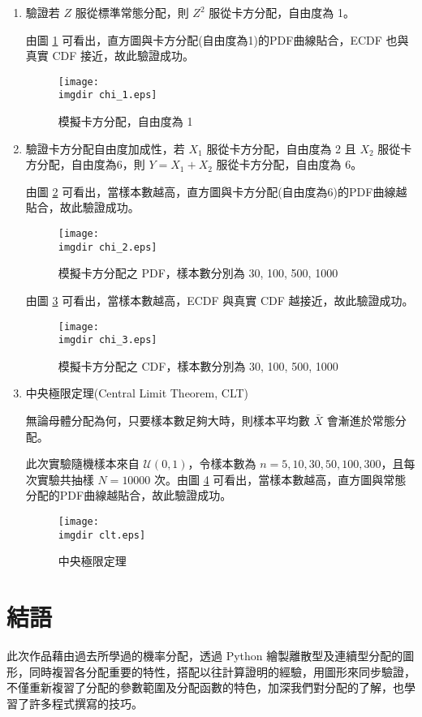 \begin{enumerate}
\item
驗證若 $Z$ 服從標準常態分配，則 $Z^2$ 服從卡方分配，自由度為 1。
 
由圖 \ref{fig:chi_1} 可看出，直方圖與卡方分配(自由度為1)的PDF曲線貼合，ECDF 也與真實 CDF 接近，故此驗證成功。
\begin{figure}[H]
    \centering
        \texttt{[image: \\imgdir chi\_1.eps]}
    \caption{模擬卡方分配，自由度為 1}
    \label{fig:chi_1}
\end{figure}

\item
驗證卡方分配自由度加成性，若 $X_1$ 服從卡方分配，自由度為 2 且 $X_2$ 服從卡方分配，自由度為6，則 $Y = X_1 + X_2$ 服從卡方分配，自由度為 6。

由圖 \ref{fig:chi_2} 可看出，當樣本數越高，直方圖與卡方分配(自由度為6)的PDF曲線越貼合，故此驗證成功。

\begin{figure}[H]
    \centering
        \texttt{[image: \\imgdir chi\_2.eps]}
    \caption{模擬卡方分配之 PDF，樣本數分別為 30, 100, 500, 1000}
    \label{fig:chi_2}    
\end{figure}
由圖 \ref{fig:chi_3} 可看出，當樣本數越高，ECDF 與真實 CDF 越接近，故此驗證成功。

\begin{figure}[H]
    \centering
        \texttt{[image: \\imgdir chi\_3.eps]}
    \caption{模擬卡方分配之 CDF，樣本數分別為 30, 100, 500, 1000}
    \label{fig:chi_3}    
\end{figure}

\item
中央極限定理(Central Limit Theorem, CLT)

無論母體分配為何，只要樣本數足夠大時，則樣本平均數 $\bar{X}$ 會漸進於常態分配。

此次實驗隨機樣本來自 $\mathcal{U}(0, 1)$，令樣本數為 $n = 5, 10, 30, 50, 100, 300$，且每次實驗共抽樣 $N = 10000$ 次。由圖 \ref{fig:clt} 可看出，當樣本數越高，直方圖與常態分配的PDF曲線越貼合，故此驗證成功。
\vspace{-0.5cm}
\begin{figure}[H]
    \centering
        \texttt{[image: \\imgdir clt.eps]}
    \caption{中央極限定理}
    \label{fig:clt}    
\end{figure}

\end{enumerate}

\section{結語}
此次作品藉由過去所學過的機率分配，透過 Python 繪製離散型及連續型分配的圖形，同時複習各分配重要的特性，搭配以往計算證明的經驗，用圖形來同步驗證，不僅重新複習了分配的參數範圍及分配函數的特色，加深我們對分配的了解，也學習了許多程式撰寫的技巧。
%
